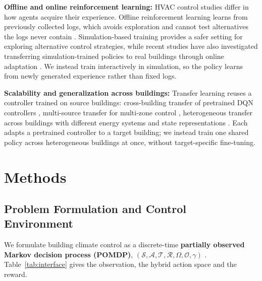 \documentclass{article}
\begin{document}
\textbf{Offline and online reinforcement learning:} HVAC control studies differ in how agents acquire their experience. Offline reinforcement learning learns from previously collected logs, which avoids exploration and cannot test alternatives the logs never contain \citep{blad2022data,levine2020offline}. Simulation-based training provides a safer setting for exploring alternative control strategies, while recent studies have also investigated transferring simulation-trained policies to real buildings through online adaptation \citep{coraci2023online}. We instead train interactively in simulation, so the policy learns from newly generated experience rather than fixed logs.

\textbf{Scalability and generalization across buildings:} Transfer learning reuses a controller trained on source buildings: cross-building transfer of pretrained DQN controllers \citep{fang2023cross}, multi-source transfer for multi-zone control \citep{hou2024multi}, heterogeneous transfer across buildings with different energy systems and state representations \citep{coraci2024heterogeneous}. Each adapts a pretrained controller to a target building; we instead train one shared policy across heterogeneous buildings at once, without target-specific fine-tuning.

\section{Methods}

\subsection{Problem Formulation and Control Environment}

We formulate building climate control as a discrete-time \textbf{partially observed Markov decision process (POMDP)}, $(\mathcal{S}, \mathcal{A}, \mathcal{T}, \mathcal{R}, \Omega, \mathcal{O}, \gamma)$ \citep{garcia2013mdp,sutton2018reinforcement}. Table~\ref{tab:interface} gives the observation, the hybrid action space and the reward.
\end{document}
